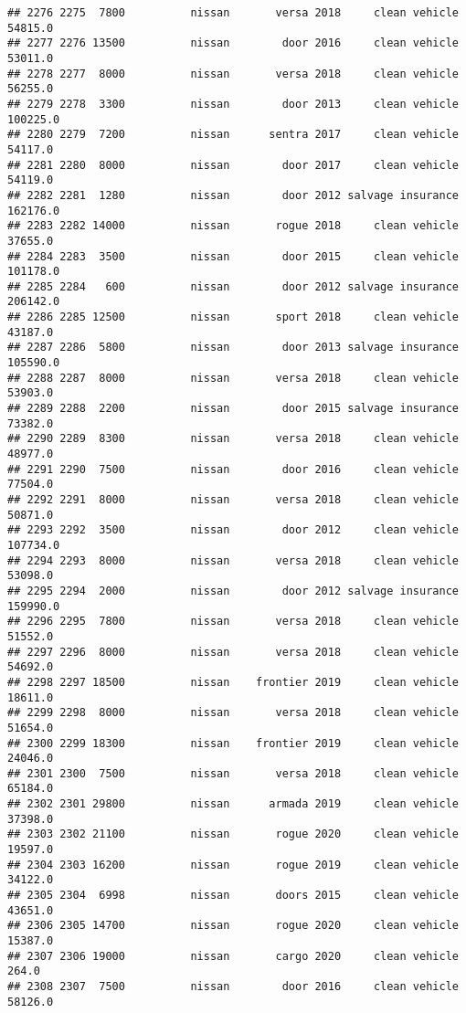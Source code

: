 \documentclass[
]{article}
\begin{document}
\begin{verbatim}
## 2276 2275  7800          nissan       versa 2018     clean vehicle   54815.0
## 2277 2276 13500          nissan        door 2016     clean vehicle   53011.0
## 2278 2277  8000          nissan       versa 2018     clean vehicle   56255.0
## 2279 2278  3300          nissan        door 2013     clean vehicle  100225.0
## 2280 2279  7200          nissan      sentra 2017     clean vehicle   54117.0
## 2281 2280  8000          nissan        door 2017     clean vehicle   54119.0
## 2282 2281  1280          nissan        door 2012 salvage insurance  162176.0
## 2283 2282 14000          nissan       rogue 2018     clean vehicle   37655.0
## 2284 2283  3500          nissan        door 2015     clean vehicle  101178.0
## 2285 2284   600          nissan        door 2012 salvage insurance  206142.0
## 2286 2285 12500          nissan       sport 2018     clean vehicle   43187.0
## 2287 2286  5800          nissan        door 2013 salvage insurance  105590.0
## 2288 2287  8000          nissan       versa 2018     clean vehicle   53903.0
## 2289 2288  2200          nissan        door 2015 salvage insurance   73382.0
## 2290 2289  8300          nissan       versa 2018     clean vehicle   48977.0
## 2291 2290  7500          nissan        door 2016     clean vehicle   77504.0
## 2292 2291  8000          nissan       versa 2018     clean vehicle   50871.0
## 2293 2292  3500          nissan        door 2012     clean vehicle  107734.0
## 2294 2293  8000          nissan       versa 2018     clean vehicle   53098.0
## 2295 2294  2000          nissan        door 2012 salvage insurance  159990.0
## 2296 2295  7800          nissan       versa 2018     clean vehicle   51552.0
## 2297 2296  8000          nissan       versa 2018     clean vehicle   54692.0
## 2298 2297 18500          nissan    frontier 2019     clean vehicle   18611.0
## 2299 2298  8000          nissan       versa 2018     clean vehicle   51654.0
## 2300 2299 18300          nissan    frontier 2019     clean vehicle   24046.0
## 2301 2300  7500          nissan       versa 2018     clean vehicle   65184.0
## 2302 2301 29800          nissan      armada 2019     clean vehicle   37398.0
## 2303 2302 21100          nissan       rogue 2020     clean vehicle   19597.0
## 2304 2303 16200          nissan       rogue 2019     clean vehicle   34122.0
## 2305 2304  6998          nissan       doors 2015     clean vehicle   43651.0
## 2306 2305 14700          nissan       rogue 2020     clean vehicle   15387.0
## 2307 2306 19000          nissan       cargo 2020     clean vehicle     264.0
## 2308 2307  7500          nissan        door 2016     clean vehicle   58126.0

\end{verbatim}
\end{document}
